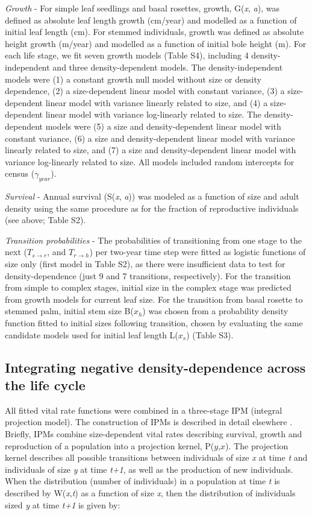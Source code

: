 \documentclass[b5paper,justified]{tufte-book} %
\begin{document}
\begin{fullwidth}
\textit{Growth} - For simple leaf seedlings and basal rosettes, growth, G(\emph{x}, \emph{a}), was defined as absolute leaf length growth (cm/year) and modelled as a function of initial leaf length (cm).  For stemmed individuals, growth was defined as absolute height growth (m/year) and modelled as a function of initial bole height (m). For each life stage, we fit seven growth models (Table S4), including 4 density-independent and three density-dependent models.  The density-independent models were (1) a constant growth null model without size or density dependence, (2) a size-dependent linear model with constant variance, (3) a size-dependent linear model with variance linearly related to size, and (4) a size-dependent linear model with variance log-linearly related to size.  The density-dependent models were (5) a size and density-dependent linear model with constant variance, (6) a size and density-dependent linear model with variance linearly related to size, and (7) a size and density-dependent linear model with variance log-linearly related to size.  All models included random intercepts for census ($\gamma_{year}$).

\textit{Survival} - Annual survival (S(\emph{x}, \emph{a})) was modeled as a function of size and adult density using the same procedure as for the fraction of reproductive individuals (see above; Table S2).

\textit{Transition probabilities} - The probabilities of transitioning from one stage to the next ($T_{s\rightarrow r}$, and $T_{r\rightarrow h}$) per two-year time step were fitted as logistic functions of size only (first model in Table S2), as there were insufficient data to test for density-dependence (just 9 and 7 transitions, respectively). For the transition from simple to complex stages, initial size in the complex stage was predicted from growth models for current leaf size. For the transition from basal rosette to stemmed palm, initial stem size B($x_h$) was chosen from a probability density function fitted to initial sizes following transition, chosen by evaluating the same candidate models used for initial leaf length L($x_s$) (Table S3). 


\subsection{Integrating negative density-dependence across the life cycle}
All fitted vital rate functions were combined in a three-stage IPM (integral projection model). The construction of IPMs is described in detail elsewhere \citep{Easterling2000, Ellner2006, Zuidema2010, Metcalf2013, Merow2014}. Briefly, IPMs combine size-dependent vital rates describing survival, growth and reproduction of a population into a projection kernel, P($y$,$x$). The projection kernel describes all possible transitions between individuals of size \emph{x} at time \emph{t} and individuals of size \emph{y} at time \emph{t+1}, as well as the production of new individuals. When the distribution (number of individuals) in a population at time \emph{t} is described by W(\emph{x},\emph{t}) as a function of size \emph{x}, then the distribution of individuals sized \emph{y} at time \emph{t+1} is given by: 


\end{fullwidth}
\end{document}
